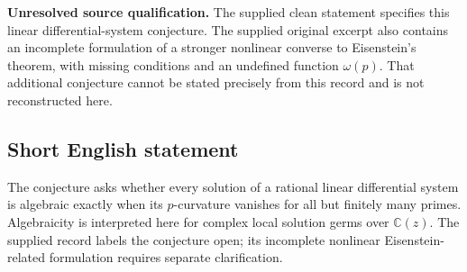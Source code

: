 \documentclass[11pt]{article}
\newcommand{\C}{\mathbb{C}}
\begin{document}
\textbf{Unresolved source qualification.} The supplied clean statement specifies this linear differential-system conjecture. The supplied original excerpt also contains an incomplete formulation of a stronger nonlinear converse to Eisenstein's theorem, with missing conditions and an undefined function \(\omega(p)\). That additional conjecture cannot be stated precisely from this record and is not reconstructed here.
\subsection{Short English statement}
The conjecture asks whether every solution of a rational linear differential system is algebraic exactly when its \(p\)-curvature vanishes for all but finitely many primes. Algebraicity is interpreted here for complex local solution germs over \(\C(z)\). The supplied record labels the conjecture open; its incomplete nonlinear Eisenstein-related formulation requires separate clarification.
\end{document}
